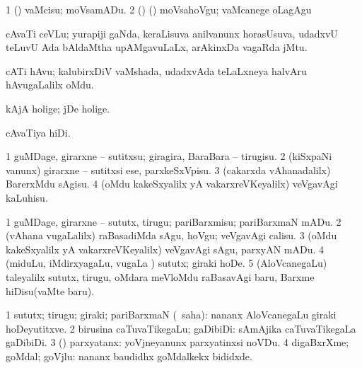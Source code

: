 {{{{{{\noindent
\gl{\akirx}
\expl{}
\bmng
\bnum
\num{1} (\AmA) vaMcisu; moVsamADu. 
\num{2} (\ame) (\ashi) moVsahoVgu; vaMcanege oLagAgu 
\enum
\emng
\eentry

\bentry 
{} 
\gl{\nA}
\expl{}
\bmng
cAvaTi ceVLu; yurapiji gaNda, keraLisuva anilvanunx horasUsuva, udadxvU teLuvU Ada bAldaMtha upAMgavuLaLx, arAkinxDa vagaRda jMtu. 
\emng
\eentry

\bentry
{} 
\gl{\nA}
\expl{}
\bmng
cATi hAvu; kalubirxDiV vaMshada, udadxvAda teLaLxneya halvAru hAvugaLalilx oMdu. 
\emng
\eentry

\bentry
{} 
\gl{\nA}
\expl{}
\bmng
{} 
\emng
\eentry

\bentry
{} 
\gl{\nA}
\expl{}
\bmng
kAjA holige; jDe holige. 
\emng
\eentry

\bentry
{} 
\gl{\nA}
\expl{}
\bmng
cAvaTiya hiDi. 
\emng
\eentry

\bentry
{} 
\gl{\akirx}
\expl{}
\bmng
{} 
\emng
\eentry

\bentry
{} 
\gl{\nA}
\expl{}
\bmng
{} 
\emng
\eentry

\bentry
{} 
\gl{\sakirx}
\expl{}
\bmng
\bnum
\num{1} guMDage, girarxne -- sutitxsu; giragira, BaraBara -- tirugisu. 
\num{2} (kiSxpaNi \mo vanunx) girarxne -- sutitxsi ese, parxkeSxVpisu. 
\num{3} (cakarxda vAhanadalilx) BarerxMdu sAgisu. 
\num{4} (oMdu kakeSxyalilx yA vakarxreVKeyalilx) veVgavAgi kaLuhisu. 
\enum
\emng

\noindent 
\gl{\akirx}
\expl{}
\bmng
\bnum
\num{1} guMDage, girarxne -- sututx, tirugu; pariBarxmisu; pariBarxmaN mADu. 
\num{2} (vAhana \mo vugaLalilx) raBasadiMda sAgu, hoVgu; veVgavAgi calisu. 
\num{3} (oMdu kakeSxyalilx yA vakarxreVKeyalilx) veVgavAgi sAgu, parxyAN mADu. 
\num{4} (miduLu, iMdirxyagaLu, \mo vugaLa \vi) sututx; giraki hoDe. 
\num{5} (AloVcanegaLu) taleyalilx sututx, tirugu, oMdara meVloMdu raBasavAgi baru, Barxme hiDisu(vaMte baru). 
\enum
\emng
\eentry

\bentry
{} 
\gl{\nA}
\expl{}
\bmng
\bnum
\num{1} sututx; tirugu; giraki; pariBarxmaN (\rUpa\ saha):  nananx AloVcanegaLu giraki hoDeyutitxve. 
\num{2} birusina caTuvaTikegaLu; gaDibiDi:  sAmAjika caTuvaTikegaLa gaDibiDi. 
\num{3} (\ashi) parxyatanx:  yoVjneyanunx parxyatinxsi noVDu. 
\num{4} digaBxrXme; goMdal; goVjlu:  nananx baudidhx goMdalkekx bididxde. 
\enum
\emng
\eentry

}}}}}}
